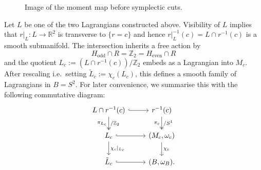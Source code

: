 \documentclass[10pt,oneside,reqno]{amsart}
\theoremstyle{definition}
\newcommand{\IR}{\mathbb{R}}
\newcommand{\IZ}{\mathbb{Z}}
\begin{document}
\begin{figure}
    \centering
    \caption{Image of the moment map before symplectic cuts.}
    \label{fig:beforecuts}
\end{figure}

Let $L$ be one of the two Lagrangians constructed above. Visibility of $L$ implies that $r\vert_L:L\to \IR^2$ is transverse to $\{r=c\}$ and hence $r\vert_L^{-1}(c)=L\cap r^{-1}(c)$ is a smooth submanifold. The intersection inherits a free action by
\begin{equation*}
    H_\text{odd} \cap R = \IZ_2 = H_\text{even}\cap R
\end{equation*}
and the quotient $L_c:=(L\cap r^{-1}(c))/\IZ_2$ embeds as a Lagrangian into $M_c$. After rescaling i.e.\ setting $\tilde{L}_c:= \chi_c(L_c)$, this defines a smooth family of Lagrangians in $B=S^2$. For later convenience, we summarise this with the following commutative diagram:
\begin{equation}\label{eq:smoothfamilyofLagrangians}
    \begin{tikzcd}
L\cap r^{-1}(c) \arrow[d, "\pi_{L_c}"',"/\IZ_2", two heads] \arrow[r, hook] & r^{-1}(c) \arrow[d, "\pi_c"',"/S^ 1", two heads]  \\
L_c \arrow[r, hook]   \arrow[d,"\chi_c\vert_{L_c}"]                                                & {(M_c,\omega_c)} \arrow[d,"\chi_c" ] \\
\tilde{L}_c \arrow[r,hook] & (B,\omega_B).
\end{tikzcd}
\end{equation}
\end{document}
